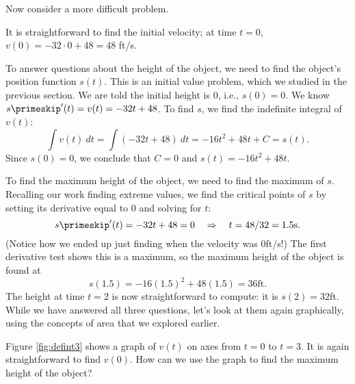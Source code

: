 Now consider a more difficult problem.\\

{It is straightforward to find the initial velocity; at time $t=0$, $v(0) =-32\cdot 0+48 = 48 $ ft/s.

To answer questions about the height of the object, we need to find the object's position function $s(t)$. This is an initial value problem, which we studied in the previous section. We are told the initial height is 0, i.e., $s(0) = 0$. We know $s\primeskip'(t) = v(t) = -32t+48$. To find $s$, we find the indefinite integral of $v(t)$:
		\[
		\int v(t)\ dt = \int (-32t+48)\ dt = -16t^2+48t+C = s(t).
		\]
Since $s(0) = 0$, we conclude that $C=0$ and $s(t) = -16t^2+48t$.

To find the maximum height of the object, we need to find the maximum of $s$. Recalling our work finding extreme values, we find the critical points of $s$ by setting its derivative equal to 0 and solving for $t$:
		\[
		s\primeskip'(t) = -32t+48 = 0 \quad \Rightarrow \quad t=48/32 = 1.5\text{s}.
		\]
(Notice how we ended up just finding when the velocity was 0ft/s!) The first derivative test shows this is a maximum, so the maximum height of the object is found at 
\[
s(1.5) = -16(1.5)^2+48(1.5)=36\text{ft}.
\]
The height at time $t=2$ is now straightforward to compute: it is $s(2) = 32$ft.\\

While we have answered all three questions, let's look at them again graphically, using the concepts of area that we explored earlier.


Figure \ref{fig:defint3} shows a graph of $v(t)$ on axes from $t=0$ to $t=3$. It is again straightforward to find $v(0)$. How can we use the graph to find the maximum height of the object?


}
